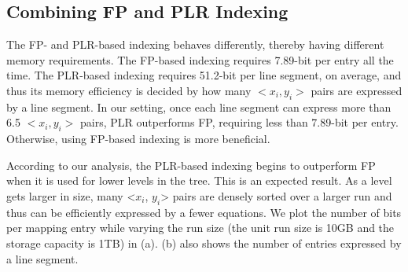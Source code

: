 \subsection{Combining FP and PLR Indexing}
\label{sec:combine}

The FP- and PLR-based indexing behaves differently, thereby having different
memory requirements.  
The FP-based indexing requires 7.89-bit per
entry all the time. The PLR-based indexing requires 
51.2-bit per line segment, on average,
and thus its memory efficiency is decided by how many 
$<x_i,y_i>$ pairs are expressed by a line segment. In our setting, 
once each line segment 
can express more than 6.5 $<x_i,y_i>$ pairs, 
PLR outperforms FP, requiring less than 7.89-bit per
entry. Otherwise, using FP-based indexing is more beneficial. 

According to our analysis, the PLR-based indexing begins to outperform FP
when it is used for lower levels in the tree.
This is an expected result.  As a level gets larger in
size, many <$x_i$, $y_i$> pairs are densely sorted over a larger run and thus
can be efficiently expressed by a fewer equations.
We plot the number of bits per mapping entry while varying the run size (the
unit run size is 10GB and the storage capacity is 1TB) in
(a).  
(b) also shows the number of entries expressed
by a line segment.

